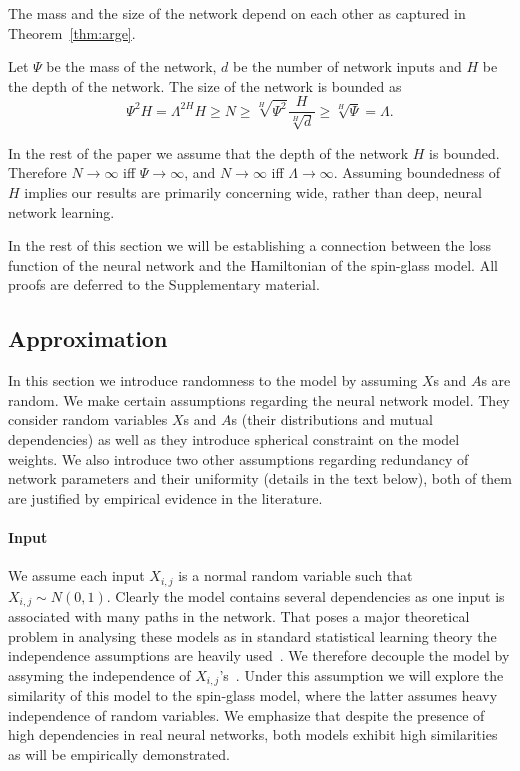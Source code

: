 \documentclass[twoside]{article}
\begin{document}
The mass and the size of the network depend on each other as captured in Theorem~\ref{thm:arge}.
\begin{theorem}
Let $\Psi$ be the mass of the network, $d$ be the number of network inputs and $H$ be the depth of the network. The size of the network is bounded as
\[\Psi^2H = \Lambda^{2H}H \geq N \geq \sqrt[H]{\Psi^2}\frac{H}{\sqrt[H]{d}} \geq \sqrt[H]{\Psi} = \Lambda.
\]
\label{thm:arge}
\end{theorem}
In the rest of the paper we assume that the depth of the network $H$ is bounded. Therefore $N \rightarrow \infty$ iff $\Psi \rightarrow \infty$, and $N \rightarrow \infty$ iff $\Lambda \rightarrow \infty$. Assuming boundedness of $H$ implies our results are primarily concerning wide, rather than deep, neural network learning.

In the rest of this section we will be establishing a connection between the loss function of the neural network and the Hamiltonian of the spin-glass model. All proofs are deferred to the Supplementary material.

\subsection{Approximation}

In this section we introduce randomness to the model by assuming $X$s and $A$s are random. We make certain assumptions regarding the neural network model. They consider random variables $X$s and $A$s (their distributions and mutual dependencies) as well as they introduce spherical constraint on the model weights. We also introduce two other assumptions regarding redundancy of network parameters and their uniformity (details in the text below), both of them are justified by empirical evidence in the literature. 

\paragraph{Input}
We assume each input $X_{i,j}$ is a normal random variable such that $X_{i,j}\sim N(0,1)$. Clearly the model contains several dependencies as one input is associated with many paths in the network. That poses a major theoretical problem in analysing these models as in standard statistical learning theory the independence assumptions are heavily used~\cite{hastie01statisticallearning}. We therefore decouple the model by assyming the independence of $X_{i,j}$'s~\cite{opac-b1095246}. Under this assumption we will explore the similarity of this model to the spin-glass model, where the latter assumes heavy independence of random variables. We emphasize that despite the presence of high dependencies in real neural networks, both models exhibit high similarities as will be empirically demonstrated. 
\end{document}
